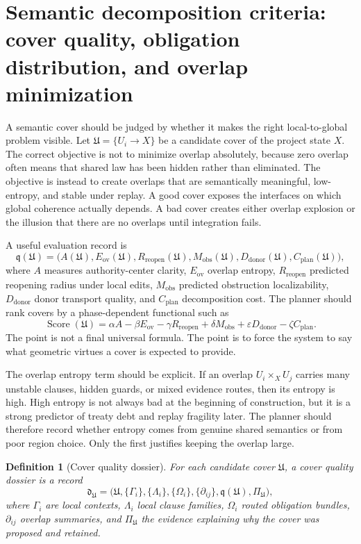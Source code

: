 \documentclass[11pt]{report}
\newtheorem{definition}{Definition}[chapter]
\begin{document}
\section{Semantic decomposition criteria: cover quality, obligation distribution, and overlap minimization}
A semantic cover should be judged by whether it makes the right local-to-global problem visible. Let $\mathfrak{U}=\{U_i \to X\}$ be a candidate cover of the project state $X$. The correct objective is not to minimize overlap absolutely, because zero overlap often means that shared law has been hidden rather than eliminated. The objective is instead to create overlaps that are semantically meaningful, low-entropy, and stable under replay. A good cover exposes the interfaces on which global coherence actually depends. A bad cover creates either overlap explosion or the illusion that there are no overlaps until integration fails.

A useful evaluation record is
\[
\mathfrak{q}(\mathfrak{U}) =
\bigl(
A(\mathfrak{U}),
E_{\mathrm{ov}}(\mathfrak{U}),
R_{\mathrm{reopen}}(\mathfrak{U}),
M_{\mathrm{obs}}(\mathfrak{U}),
D_{\mathrm{donor}}(\mathfrak{U}),
C_{\mathrm{plan}}(\mathfrak{U})
\bigr),
\]
where $A$ measures authority-center clarity, $E_{\mathrm{ov}}$ overlap entropy, $R_{\mathrm{reopen}}$ predicted reopening radius under local edits, $M_{\mathrm{obs}}$ predicted obstruction localizability, $D_{\mathrm{donor}}$ donor transport quality, and $C_{\mathrm{plan}}$ decomposition cost. The planner should rank covers by a phase-dependent functional such as
\[
\operatorname{Score}(\mathfrak{U})
=
\alpha A
-\beta E_{\mathrm{ov}}
-\gamma R_{\mathrm{reopen}}
+\delta M_{\mathrm{obs}}
+\varepsilon D_{\mathrm{donor}}
-\zeta C_{\mathrm{plan}}.
\]
The point is not a final universal formula. The point is to force the system to say what geometric virtues a cover is expected to provide.

The overlap entropy term should be explicit. If an overlap $U_i \times_X U_j$ carries many unstable clauses, hidden guards, or mixed evidence routes, then its entropy is high. High entropy is not always bad at the beginning of construction, but it is a strong predictor of treaty debt and replay fragility later. The planner should therefore record whether entropy comes from genuine shared semantics or from poor region choice. Only the first justifies keeping the overlap large.

\begin{definition}[Cover quality dossier]
For each candidate cover $\mathfrak{U}$, a cover quality dossier is a record
\[
\mathfrak{d}_{\mathfrak{U}}
=
\bigl(
\mathfrak{U},
\{\Gamma_i\},
\{\Lambda_i\},
\{\Omega_i\},
\{\partial_{ij}\},
\mathfrak{q}(\mathfrak{U}),
\Pi_{\mathfrak{U}}
\bigr),
\]
where $\Gamma_i$ are local contexts, $\Lambda_i$ local clause families, $\Omega_i$ routed obligation bundles, $\partial_{ij}$ overlap summaries, and $\Pi_{\mathfrak{U}}$ the evidence explaining why the cover was proposed and retained.
\end{definition}
\end{document}

